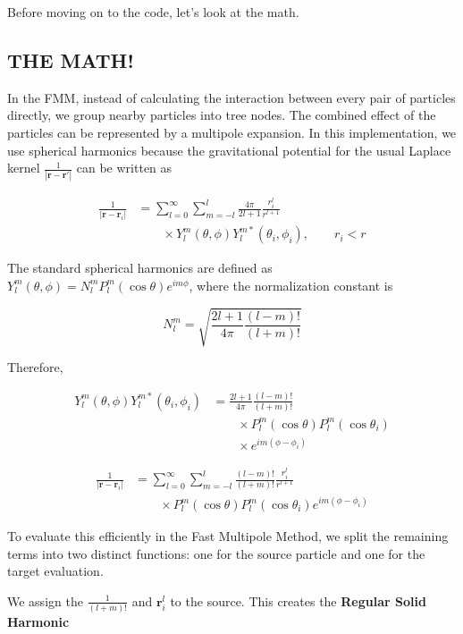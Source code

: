 Before moving on to the code, let's look at the math.

\subsection*{THE MATH!}

In the FMM, instead of calculating the interaction between every pair of particles directly, we group nearby particles into tree nodes. The combined effect of the particles can be represented by a multipole expansion. In this implementation, we use spherical harmonics because the gravitational potential for the usual Laplace kernel $\frac{1}{\left|\mathbf{r} - \mathbf{r}'\right|}$ can be written as

\[
\begin{aligned}
\frac{1}{\left|\mathbf{r} - \mathbf{r}_{i}\right|}
&=\sum_{l=0}^{\infty}\sum_{m=-l}^{l}
\frac{4\pi}{2l+1}\frac{r_i^l}{r^{l+1}}\\
&\qquad\times Y_{l}^{m}(\theta, \phi)
Y_{l}^{m*}(\theta_{i}, \phi_{i}),\qquad r_i<r
\end{aligned}
\]

The standard spherical harmonics are defined as $Y_{l}^{m}(\theta, \phi) = N_{l}^{m}P_{l}^{m}(\cos\theta)e^{im\phi}$, where the normalization constant is

\[
N_{l}^{m}
=
\sqrt{\frac{2l+1}{4\pi}\frac{(l-m)!}{(l+m)!}}
\]

Therefore,

\[
\begin{aligned}
Y_{l}^{m}(\theta, \phi)Y_{l}^{m*}(\theta_i,\phi_i)
&=\frac{2l+1}{4\pi}\frac{(l-m)!}{(l+m)!}\\
&\qquad\times P_{l}^{m}(\cos\theta)P_{l}^{m}(\cos\theta_i)\\
&\qquad\times e^{im(\phi-\phi_i)}
\end{aligned}
\]

\[
\begin{aligned}
\frac{1}{\left|\mathbf{r} - \mathbf{r}_{i}\right|}
&=\sum_{l=0}^{\infty}\sum_{m=-l}^{l}
\frac{(l-m)!}{(l+m)!}\frac{r_i^l}{r^{l+1}}\\
&\qquad\times P_{l}^{m}(\cos\theta)P_{l}^{m}(\cos\theta_i)
e^{im(\phi-\phi_i)}
\end{aligned}
\]

To evaluate this efficiently in the Fast Multipole Method, we split the remaining terms into two distinct functions: one for the source particle and one for the target evaluation.

We assign the $\frac{1}{(l+m)!}$ and $\mathbf{r}_{i}^{l}$ to the source. This creates the \textbf{Regular Solid Harmonic}

